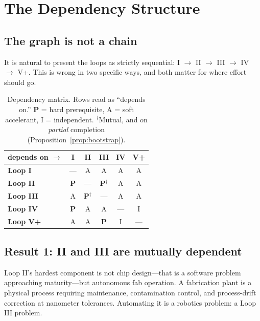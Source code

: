 \documentclass[11pt]{article}
\begin{document}
\section{The Dependency Structure}
\label{sec:deps}

\subsection{The graph is not a chain}

It is natural to present the loops as strictly sequential: I $\rightarrow$ II $\rightarrow$ III $\rightarrow$ IV $\rightarrow$ V+. This is wrong in two specific ways, and both matter for where effort should go.

\begin{table}[h]
\centering
\footnotesize
\begin{tabular}{@{}lccccc@{}}
\toprule
depends on $\rightarrow$ & I & II & III & IV & V+ \\
\midrule
\textbf{Loop I}   & ---          & A            & A   & A   & A \\
\textbf{Loop II}  & \textbf{P}   & ---          & \textbf{P}$^{\dagger}$ & A & A \\
\textbf{Loop III} & A            & \textbf{P}$^{\dagger}$ & --- & A & A \\
\textbf{Loop IV}  & \textbf{P}   & A            & A   & --- & I \\
\textbf{Loop V+}  & A            & A            & \textbf{P} & I & --- \\
\bottomrule
\end{tabular}
\caption{Dependency matrix. Rows read as ``depends on.'' \textbf{P} = hard prerequisite, A = soft accelerant, I = independent. $^{\dagger}$Mutual, and on \emph{partial} completion (Proposition~\ref{prop:bootstrap}).}
\end{table}

\subsection{Result 1: II and III are mutually dependent}

Loop II's hardest component is not chip design---that is a software problem approaching maturity---but autonomous fab operation. A fabrication plant is a physical process requiring maintenance, contamination control, and process-drift correction at nanometer tolerances. Automating it is a robotics problem: a Loop III problem.
\end{document}
